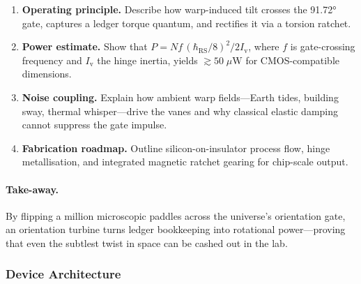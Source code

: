 \documentclass[11pt,oneside]{book}
\begin{document}
\begin{enumerate}[label=\arabic*.,leftmargin=*,itemsep=3pt]
\item \textbf{Operating principle.}  
      Describe how warp-induced tilt crosses the 91.72° gate, captures
      a ledger torque quantum, and rectifies it via a torsion ratchet.
\item \textbf{Power estimate.}  
      Show that
      \(P=Nf\,\!(\hbar_{\mathrm{RS}}/8)^{2}/2I_{\mathrm{v}}\),
      where \(f\) is gate-crossing frequency and \(I_{\mathrm{v}}\) the
      hinge inertia, yields \(\gtrsim50\;\mu\text{W}\) for
      CMOS-compatible dimensions.
\item \textbf{Noise coupling.}  
      Explain how ambient warp fields—Earth tides, building sway,
      thermal whisper—drive the vanes and why classical elastic
      damping cannot suppress the gate impulse.
\item \textbf{Fabrication roadmap.}  
      Outline silicon-on-insulator process flow, hinge metallisation,
      and integrated magnetic ratchet gearing for chip-scale output.
\end{enumerate}

\paragraph{Take-away.}
By flipping a million microscopic paddles across the universe’s
orientation gate, an orientation turbine turns ledger bookkeeping into
rotational power—proving that even the subtlest twist in space can be
cashed out in the lab.



\subsubsection{Device Architecture}
\label{ss:oturbine-arch}
\end{document}
